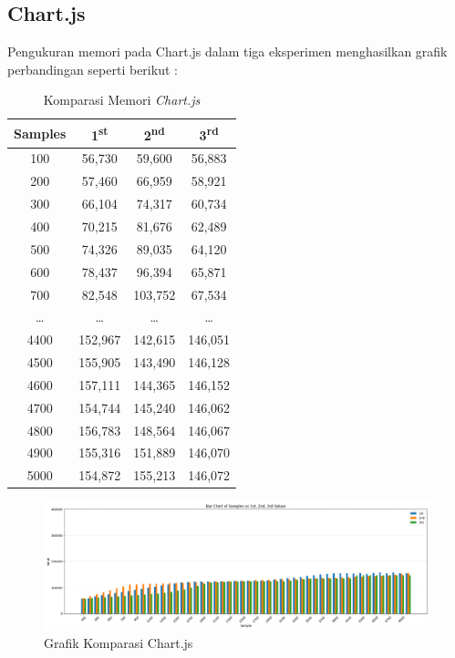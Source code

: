 \subsection{Chart.js}
Pengukuran memori pada Chart.js dalam tiga eksperimen menghasilkan grafik perbandingan seperti berikut :
\begin{table}[H]
	\centering
	\caption{Komparasi Memori \textit{Chart.js}}
	\begin{tabular}{|c|c|c|c|}
		\hline
		\textbf{Samples} & \textbf{1\textsuperscript{st}} & \textbf{2\textsuperscript{nd}} & \textbf{3\textsuperscript{rd}} \\
		\hline
		100  & 56{,}730 & 59{,}600  & 56{,}883 \\
		200  & 57{,}460 & 66{,}959  & 58{,}921 \\
		300  & 66{,}104 & 74{,}317  & 60{,}734 \\
		400  & 70{,}215 & 81{,}676  & 62{,}489 \\
		500  & 74{,}326 & 89{,}035  & 64{,}120 \\
		600  & 78{,}437 & 96{,}394  & 65{,}871 \\
		700  & 82{,}548 & 103{,}752 & 67{,}534 \\
		\ldots & \ldots & \ldots & \ldots \\
		4400 & 152{,}967 & 142{,}615 & 146{,}051 \\
		4500 & 155{,}905 & 143{,}490 & 146{,}128 \\
		4600 & 157{,}111 & 144{,}365 & 146{,}152 \\
		4700 & 154{,}744 & 145{,}240 & 146{,}062 \\
		4800 & 156{,}783 & 148{,}564 & 146{,}067 \\
		4900 & 155{,}316 & 151{,}889 & 146{,}070 \\
		5000 & 154{,}872 & 155{,}213 & 146{,}072 \\
		\hline
	\end{tabular}
\end{table}

	\begin{figure}[H]
	\centering
	\includegraphics[width=0.8\linewidth]{gambar/Pembahasan/FIX_Memori/cjs.png}
	\caption{Grafik Komparasi Chart.js}
	\label{Grafik Komparasi Chart.js}
\end{figure}


